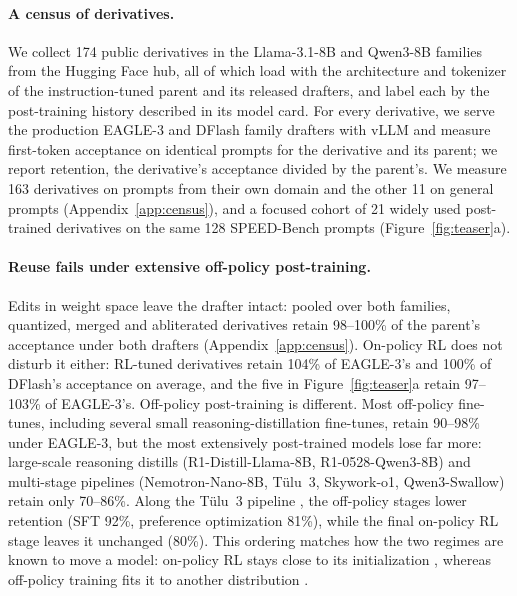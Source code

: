 \documentclass[11pt]{article}
\begin{document}
\paragraph{A census of derivatives.}
We collect 174 public derivatives in the Llama-3.1-8B and Qwen3-8B families \citep{llama3herd,qwen3} from the Hugging Face hub, all of which load with the architecture and tokenizer of the instruction-tuned parent and its released drafters, and label each by the post-training history described in its model card.
For every derivative, we serve the production EAGLE-3 and DFlash family drafters with vLLM \citep{kwon2023vllm} and measure first-token acceptance on identical prompts for the derivative and its parent; we report retention, the derivative's acceptance divided by the parent's.
We measure 163 derivatives on prompts from their own domain and the other 11 on general prompts (Appendix~\ref{app:census}), and a focused cohort of 21 widely used post-trained derivatives on the same 128 SPEED-Bench prompts (Figure~\ref{fig:teaser}a).

\paragraph{Reuse fails under extensive off-policy post-training.}
Edits in weight space leave the drafter intact: pooled over both families, quantized, merged and abliterated derivatives retain 98--100\% of the parent's acceptance under both drafters (Appendix~\ref{app:census}).
On-policy RL does not disturb it either: RL-tuned derivatives retain 104\% of EAGLE-3's and 100\% of DFlash's acceptance on average, and the five in Figure~\ref{fig:teaser}a retain 97--103\% of EAGLE-3's.
Off-policy post-training is different.
Most off-policy fine-tunes, including several small reasoning-distillation fine-tunes, retain 90--98\% under EAGLE-3, but the most extensively post-trained models lose far more: large-scale reasoning distills (R1-Distill-Llama-8B, R1-0528-Qwen3-8B) and multi-stage pipelines (Nemotron-Nano-8B, T\"ulu~3, Skywork-o1, Qwen3-Swallow) retain only 70--86\%.
Along the T\"ulu~3 pipeline \citep{lambert2024tulu3}, the off-policy stages lower retention (SFT 92\%, preference optimization 81\%), while the final on-policy RL stage leaves it unchanged (80\%).
This ordering matches how the two regimes are known to move a model: on-policy RL stays close to its initialization \citep{shenfeld2026razor,chen2026retaining}, whereas off-policy training fits it to another distribution \citep{hinton2015distilling,kim2016sequence}.
\end{document}
